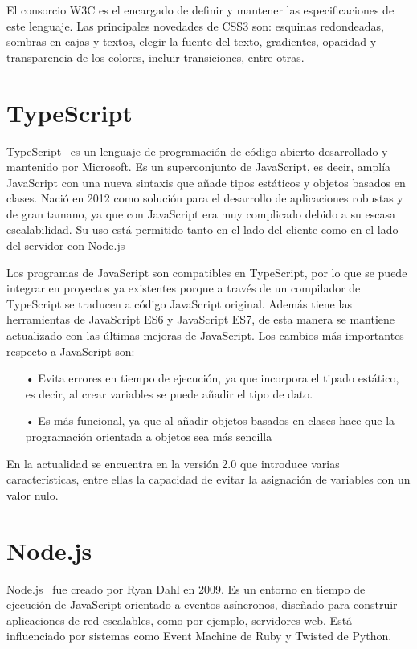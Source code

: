 \documentclass[a4paper, 12pt]{book}
\begin{document}
El consorcio W3C es el encargado de definir y mantener las especificaciones de este lenguaje. Las principales novedades de CSS3 son: esquinas redondeadas, sombras en cajas y textos, elegir la fuente del texto, gradientes, opacidad y transparencia de los colores, incluir transiciones, entre otras.

\section{TypeScript} 
\label{sec:TypeScript}

TypeScript~\cite{Pagina_de_typescript} es un lenguaje de programación de código abierto desarrollado y mantenido por Microsoft. Es un superconjunto de JavaScript, es decir, amplía JavaScript con una nueva sintaxis que añade tipos estáticos y objetos basados en clases. Nació en 2012 como solución para el desarrollo de aplicaciones  robustas y de gran tamano, ya que con JavaScript era muy complicado debido a su escasa escalabilidad. Su uso está permitido tanto en el lado del cliente como en el lado del servidor con Node.js

 Los programas de JavaScript son compatibles en TypeScript, por lo que se puede integrar en proyectos ya existentes porque a través de un compilador de TypeScript se traducen a código JavaScript original. Además tiene las herramientas de JavaScript ES6 y JavaScript ES7, de esta manera se mantiene actualizado con las últimas mejoras de JavaScript. Los cambios más importantes respecto a JavaScript son:

\begin{itemize}
	\item[•] Evita errores en tiempo de ejecución, ya que incorpora el tipado estático, es decir, al crear variables se puede añadir el tipo de dato.
	
	\item[•] Es más funcional, ya que al añadir objetos basados en clases hace que la programación orientada a objetos sea más sencilla
\end{itemize}

En la actualidad se encuentra en la versión 2.0 que introduce varias características, entre ellas la capacidad de evitar la asignación de variables con un valor nulo. 

\section{Node.js} 
\label{sec:Node}

Node.js~\cite{Pagina_de_Node} fue creado por Ryan Dahl en 2009. Es un entorno en tiempo de ejecución de JavaScript orientado a eventos asíncronos, diseñado para construir aplicaciones de red escalables, como por ejemplo, servidores web. Está influenciado por sistemas como Event Machine de Ruby y Twisted de Python.
\end{document}
